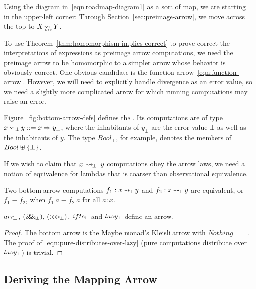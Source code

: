 \documentclass[preprint]{sigplanconf}
\newcommand{\arrow}{\rightsquigarrow}
\newcommand{\arrowarr}{\ensuremath{arr}}
\newcommand{\arrowcomp}{\ensuremath{{>}\mspace{-6mu}{>}\mspace{-6mu}{>}}}
\newcommand{\arrowpair}{\ensuremath{\mathit{\&\mspace{-7.5mu}\&\mspace{-7.5mu}\&}}}
\newcommand{\arrowif}{\ensuremath{ifte}}
\newcommand{\arrowlazy}{\ensuremath{lazy}}
\DeclareMathOperator{\botto}{\arrow_{\mspace{-3mu}\bot}}
\newcommand{\arrbot}{\arrowarr_{\mspace{-3mu}\bot}}
\newcommand{\compbot}{\arrowcomp_{\mspace{-5mu}\bot}}
\newcommand{\pairbot}{\arrowpair_{\mspace{-3mu}\bot}}
\newcommand{\ifbot}{\arrowif_{\mspace{-2mu}\bot}}
\newcommand{\lazybot}{\arrowlazy_{\mspace{-2mu}\bot}}
\newcommand{\pre}{_\mathrm{pre}}
\DeclareMathOperator{\preto}{\arrow_{\mspace{-19mu}\pre}}
\begin{document}
Using the diagram in~\eqref{eqn:roadmap-diagram1} as a sort of map, we are starting in the upper-left corner:
Through Section~\ref{sec:preimage-arrow}, we move across the top to $X \preto Y$.

To use Theorem~\ref{thm:homomorphism-implies-correct} to prove correct the interpretations of expressions as preimage arrow computations, we need the preimage arrow to be homomorphic to a simpler arrow whose behavior is obviously correct.
One obvious candidate is the function arrow~\eqref{eqn:function-arrow}.
However, we will need to explicitly handle divergence as an error value, so we need a slightly more complicated arrow for which running computations may raise an error.

Figure~\ref{fig:bottom-arrow-defs} defines the .
Its computations are of type $x \botto y ::= x \tto y_\bot$, where the inhabitants of $y_\bot$ are the error value $\bot$ as well as the inhabitants of $y$.
The type $Bool_\bot$, for example, denotes the members of $Bool \uplus \{{\bot}\}$.

If we wish to claim that $x~\botto~y$ computations obey the arrow laws, we need a notion of equivalence for lambdas that is coarser than observational equivalence.
\begin{definition}
Two bottom arrow computations $f_1 : x \botto y$ and $f_2 : x \botto y$ are equivalent, or $f_1 \equiv f_2$, when $f_1~a \equiv f_2~a$ for all $a : x$.
\end{definition}

\begin{theorem}
$\arrbot$, $(\pairbot)$, $(\compbot)$, $\ifbot$ and $\lazybot$ define an arrow.
\end{theorem}
\begin{proof}
The bottom arrow is the Maybe monad's Kleisli arrow with $Nothing = \bot$.
The proof of~\eqref{eqn:pure-distributes-over-lazy} (pure computations distribute over $\lazybot$) is trivial.
\end{proof}

\subsection{Deriving the Mapping Arrow}
\end{document}
